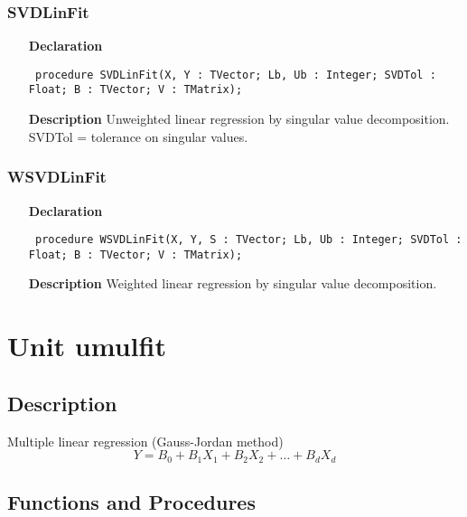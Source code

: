 \documentclass[12pt,a4paper,oneside]{report}
\newcommand{\declarationitem}[1]{\textbf{#1}}
\newcommand{\descriptiontitle}[1]{\textbf{#1}}
\newcommand{\code}[1]{\texttt{#1}}
\begin{document}
\subsubsection{SVDLinFit}
\label{ulinfit-SVDLinFit}
\begin{itemize}\item[\declarationitem{Declaration}\hfill]
	\begin{flushleft}
		\code{
			procedure SVDLinFit(X, Y : TVector; Lb, Ub : Integer; SVDTol : Float; B : TVector; V : TMatrix);}
		
	\end{flushleft}
	
	\par
	\item[\descriptiontitle{Description}]
	Unweighted linear regression by singular value decomposition. SVDTol = tolerance on singular values.
	
\end{itemize}
\subsubsection{WSVDLinFit}
\label{ulinfit-WSVDLinFit}
\begin{itemize}\item[\declarationitem{Declaration}\hfill]
	\begin{flushleft}
		\code{
			procedure WSVDLinFit(X, Y, S : TVector; Lb, Ub : Integer; SVDTol : Float; B : TVector; V : TMatrix);}
		
	\end{flushleft}
	
	\par
	\item[\descriptiontitle{Description}]
	Weighted linear regression by singular value decomposition.
	
\end{itemize}
\section{Unit umulfit}
\label{umulfit}
\subsection{Description}
Multiple linear regression (Gauss-Jordan method) 
$$Y = B_0 + B_1X_1 + B_2X_2 +\dots+ B_dX_d$$
\subsection{Functions and Procedures}
\end{document}
